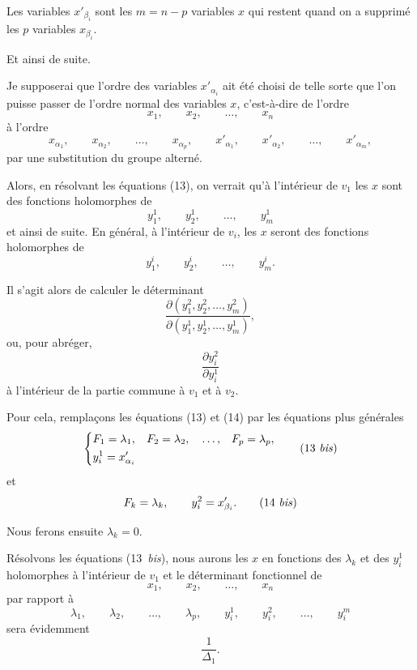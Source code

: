 \documentclass{article}
\begin{document}
Les variables $x'_{\beta_{i}}$ sont les $m = n - p$ variables $x$ qui restent quand on a supprimé les $p$ variables $x_{\beta_{i}}$.

Et ainsi de suite.

Je supposerai que l'ordre des variables $x'_{\alpha_{i}}$ ait été choisi de telle sorte que l'on puisse passer de l'ordre normal des variables $x$, c'est-à-dire de l'ordre
\[
x_{1}, \qquad x_{2}, \qquad \ldots, \qquad x_{n}
\]
à l'ordre
\[
x_{\alpha_{1}}, \qquad x_{\alpha_{2}}, \qquad \ldots, \qquad x_{\alpha_{p}}, \qquad x'_{\alpha_{1}}, \qquad x'_{\alpha_{2}}, \qquad \ldots, \qquad x'_{\alpha_{m}},
\]
par une substitution du groupe alterné.

Alors, en résolvant les équations (13), on verrait qu'à l'intérieur de $v_{1}$ les $x$ sont des fonctions holomorphes de
\[
y^{1}_{1}, \qquad y^{1}_{2}, \qquad \ldots, \qquad y^{1}_{m}
\]
et ainsi de suite. En général, à l'intérieur de $v_{i}$, les $x$ seront des fonctions holomorphes de
\[
y^{i}_{1}, \qquad y^{i}_{2}, \qquad \ldots, \qquad y^{i}_{m}.
\]

Il s'agit alors de calculer le déterminant
\[
\frac{\partial(y^{2}_{1}, y^{2}_{2}, \ldots, y^{2}_{m})}{\partial(y^{1}_{1}, y^{1}_{2}, \ldots, y^{1}_{m})},
\]
ou, pour abréger,
\[
\frac{\partial y^{2}_{i}}{\partial y^{1}_{i}}
\]
à l'intérieur de la partie commune à $v_{1}$ et à $v_{2}$.

Pour cela, remplaçons les équations (13) et (14) par les équations plus générales
\[
\left\{
\begin{aligned}
&F_{1} = \lambda_{1}, &&F_{2} = \lambda_{2}, &&\ldots, &&F_{p} = \lambda_{p},\\
&y^{1}_{i} = x'_{\alpha_{i}}
\end{aligned}
\right.
\tag{13 \textit{bis}}
\]
et
\[
F_{k} = \lambda_{k}, \qquad y^{2}_{i} = x'_{\beta_{i}}.
\tag{14 \textit{bis}}
\]

Nous ferons ensuite $\lambda_{k} = 0$.

Résolvons les équations (13~\emph{bis}), nous aurons les $x$ en fonctions des $\lambda_{k}$ et des $y^{1}_{i}$ holomorphes à l'intérieur de $v_{1}$ et le déterminant fonctionnel de
\[
x_{1}, \qquad x_{2}, \qquad \ldots, \qquad x_{n}
\]
par rapport à
\[
\lambda_{1}, \qquad \lambda_{2}, \qquad \ldots, \qquad \lambda_{p}, \qquad y^{1}_{i}, \qquad y^{2}_{i}, \qquad \ldots, \qquad y^{m}_{i}
\]
 sera évidemment
\[
\frac{1}{\Delta_{1}}.
\]
\end{document}
